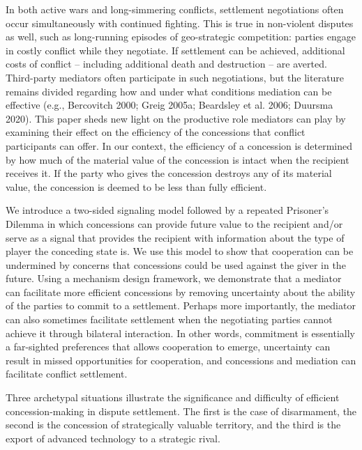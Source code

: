 \documentclass[12pt, letterpaper]{article}
\begin{document}
In both active wars and long-simmering conflicts, settlement negotiations often occur simultaneously with continued fighting. This is true in non-violent disputes as well, such as long-running episodes of geo-strategic competition: parties engage in costly conflict while they negotiate. If settlement can be achieved, additional costs of conflict -- including additional death and destruction -- are averted. Third-party mediators often participate in such negotiations, but the literature remains divided regarding how and under what conditions mediation can be effective (e.g., Bercovitch 2000; Greig 2005a; Beardsley et al. 2006; Duursma 2020).  This paper sheds new light on the productive role mediators can play by examining their effect on the efficiency of the concessions that conflict participants can offer. In our context, the efficiency of a concession is determined by how much of the material value of the concession is intact when the recipient receives it. If the party who gives the concession destroys any of its material value, the concession is deemed to be less than fully efficient.

We introduce a two-sided signaling model followed by a repeated Prisoner's Dilemma in which concessions can provide future value to the recipient and/or serve as a signal that provides the recipient with information about the type of player the conceding state is. We use this model to show that cooperation can be undermined by concerns that concessions could be used against the giver in the future. Using a mechanism design framework, we demonstrate that a mediator can facilitate more efficient concessions by removing uncertainty about the ability of the parties to commit to a settlement. Perhaps more importantly, the mediator can also sometimes facilitate settlement when the negotiating parties cannot achieve it through bilateral interaction. In other words, commitment is essentially a far-sighted preferences that allows cooperation to emerge, uncertainty can result in missed opportunities for cooperation, and concessions and mediation can facilitate conflict settlement.

Three archetypal situations illustrate the significance and difficulty of efficient concession-making in dispute settlement.  The first is the case of disarmament, the second is the concession of strategically valuable territory, and the third is the export of advanced technology to a strategic rival. %
\end{document}
